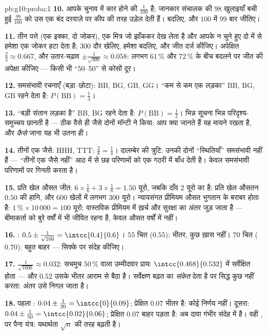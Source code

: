 \begin{solution}{pb:g10:proba:1}
\textbf{10.} आपके चुनाव में कार होने की  $\frac{1}{100}$ है; जानकार संचालक की
$98$ खुलाइयाँ बची हुई $\frac{99}{100}$ को उस एक बंद दरवाज़े पर कीप की तरह उड़ेल देती
हैं। बदलिए, और $100$ में $99$ बार जीतिए।

\textbf{11.} तीन पत्ते (एक इक्का, दो जोकर), एक मित्र जो झाँककर देख लेता है
और आपके न चुने हुए दो में से हमेशा एक जोकर हटा देता है; $300$ दौर खेलिए,
हमेशा बदलिए, और जीत दर्ज कीजिए। अपेक्षित  $\frac23 \approx 0.667$, और
उतार-चढ़ाव $\pm\frac{1}{\sqrt{300}} \approx 0.058$: लगभग $61\,\%$ और $72\,\%$ के बीच बदलने पर जीत की अपेक्षा
कीजिए --- किसी भी ``50--50'' से कोसों दूर।

\textbf{12.} समसंभावी रचनाएँ (बड़ा--छोटा): BB, BG, GB, GG। ``कम से कम एक
लड़का'' BB, BG, GB रहने देता है: $P(\text{BB}) = \frac13$।

\textbf{13.} ``बड़ी संतान लड़का है'' BB, BG रहने देता है: $P(\text{BB}) = \frac12$। भिन्न सूचना
भिन्न परिदृश्य-समुच्चय छानती है --- ठीक वैसे ही जैसे दोनों मॉन्टी ने किया:
आप क्या जानते हैं यह मायने रखता है, और \emph{कैसे} जाना यह भी उतना ही।

\textbf{14.} तीनों एक जैसे: HHH, TTT: $\frac28 = \frac14$। दालम्बेर की त्रुटि: उनकी दोनों
``स्थितियाँ'' समसंभावी नहीं हैं --- ``तीनों एक जैसे नहीं'' आठ में से छह
परिणामों को एक गठरी में बाँध देती है।  केवल समसंभावी परिणामों पर गिनती
करता है।

\textbf{15.} प्रति खेल औसत जीत: $6 \times \frac16 + 3
\times \frac16 = 1.50$ यूरो, जबकि दाँव $2$ यूरो का है:
प्रति खेल औसतन $0.50$ की हानि, और $600$ खेलों में लगभग $300$ यूरो। न्यायसंगत
प्रीमियम औसत भुगतान के बराबर होता है: $1\,\% \times 10\,000 = 100$ यूरो; वास्तविक प्रीमियम में
ख़र्च और सुरक्षा का अंतर जुड़ जाता है --- बीमाकर्ता को बुरे वर्षों में भी
जीवित रहना है, केवल औसत वर्षों में नहीं।

\textbf{16.} : $0.5 \pm \frac{1}{\sqrt{100}} =
\intcc{0.4}{0.6}$। $55$ चित ($0.55$): भीतर, कुछ ख़ास नहीं। $70$
चित ($0.70$): बहुत बाहर --- सिक्के पर संदेह कीजिए।

\textbf{17.} $\frac{1}{\sqrt{1000}} \approx 0.032$: सचमुच $50\,\%$ वाला उम्मीदवार प्रायः $\intcc{0.468}{0.532}$ में सर्वेक्षित
होता --- और $0.52$ उसके भीतर आराम से बैठा है। सर्वेक्षण बढ़त का \emph{संकेत}
देता है पर सिद्ध कुछ नहीं करता: अंतर उसे निगल जाता है।

\textbf{18.} पहला :  $0.04 \pm \frac{1}{20} =
\intcc{0}{0.09}$; प्रेक्षित $0.07$ भीतर है: कोई
निर्णय नहीं। दूसरा: $0.04 \pm \frac{1}{50} = \intcc{0.02}{0.06}$; प्रेक्षित $0.07$ बाहर पड़ता है: अब दावा गंभीर
संदेह में है। वही , पर पैना यंत्र: यथार्थता $\sqrt n$ की तरह
बढ़ती है।


\end{solution}
